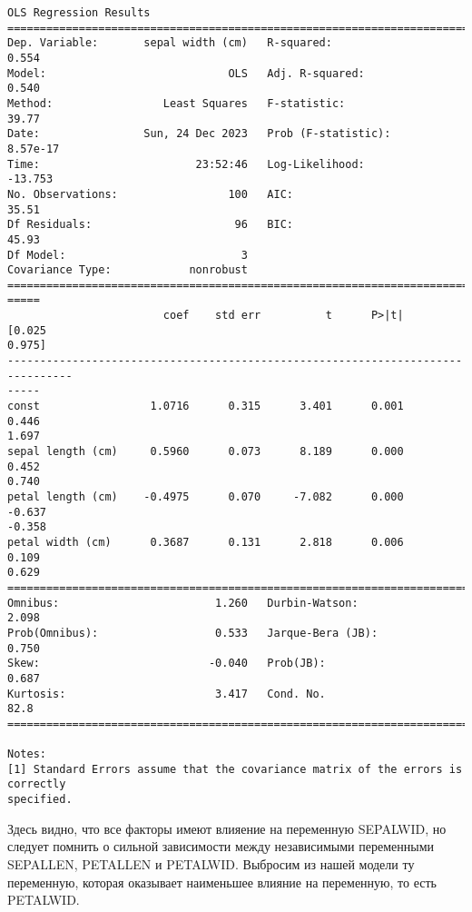 \documentclass[11pt]{article}
\begin{document}
    \begin{Verbatim}[commandchars=\\\{\}]
                            OLS Regression Results
==============================================================================
Dep. Variable:       sepal width (cm)   R-squared:                       0.554
Model:                            OLS   Adj. R-squared:                  0.540
Method:                 Least Squares   F-statistic:                     39.77
Date:                Sun, 24 Dec 2023   Prob (F-statistic):           8.57e-17
Time:                        23:52:46   Log-Likelihood:                -13.753
No. Observations:                 100   AIC:                             35.51
Df Residuals:                      96   BIC:                             45.93
Df Model:                           3
Covariance Type:            nonrobust
================================================================================
=====
                        coef    std err          t      P>|t|      [0.025
0.975]
--------------------------------------------------------------------------------
-----
const                 1.0716      0.315      3.401      0.001       0.446
1.697
sepal length (cm)     0.5960      0.073      8.189      0.000       0.452
0.740
petal length (cm)    -0.4975      0.070     -7.082      0.000      -0.637
-0.358
petal width (cm)      0.3687      0.131      2.818      0.006       0.109
0.629
==============================================================================
Omnibus:                        1.260   Durbin-Watson:                   2.098
Prob(Omnibus):                  0.533   Jarque-Bera (JB):                0.750
Skew:                          -0.040   Prob(JB):                        0.687
Kurtosis:                       3.417   Cond. No.                         82.8
==============================================================================

Notes:
[1] Standard Errors assume that the covariance matrix of the errors is correctly
specified.
    \end{Verbatim}

    Здесь видно, что все факторы имеют влияение на переменную SEPALWID, но
следует помнить о сильной зависимости между независимыми переменными
SEPALLEN, PETALLEN и PETALWID. Выбросим из нашей модели ту переменную,
которая оказывает наименьшее влияние на переменную, то есть PETALWID.
\end{document}
